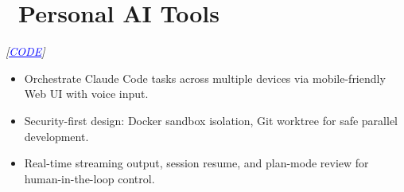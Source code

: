 \documentclass{resume}
\begin{document}
\section{\faHeartO\ Personal AI Tools}
 {\it[\href{https://github.com/luyi256/CCManager}{\textcolor{blue}{\underline{CODE}}}]}
\begin{itemize}
  \item Orchestrate Claude Code tasks across multiple devices via mobile-friendly Web UI with voice input.
  \item Security-first design: Docker sandbox isolation, Git worktree for safe parallel development.
  \item Real-time streaming output, session resume, and plan-mode review for human-in-the-loop control.
\end{itemize}
\end{document}
